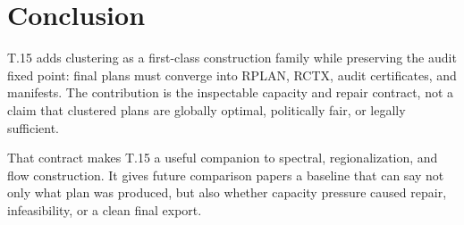 \section{Conclusion}

T.15 adds clustering as a first-class construction family while preserving the
audit fixed point: final plans must converge into RPLAN, RCTX, audit
certificates, and manifests. The contribution is the inspectable capacity and
repair contract, not a claim that clustered plans are globally optimal,
politically fair, or legally sufficient.

That contract makes T.15 a useful companion to spectral, regionalization, and
flow construction. It gives future comparison papers a baseline that can say
not only what plan was produced, but also whether capacity pressure caused
repair, infeasibility, or a clean final export.
